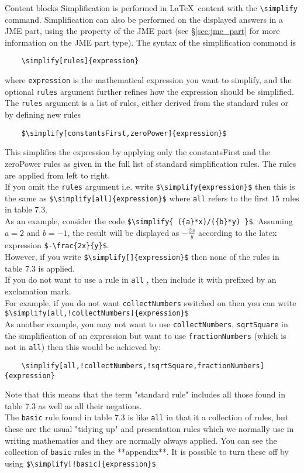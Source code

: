 \begin{chapter}{\label{cha:content_blocks}Content blocks}
  Simplification is performed in \LaTeX\ content with the \verb"\simplify"
  command.  Simplification can also be performed on the displayed answers in a
  JME part, using the  property of the JME part
  (see \S\ref{sec:jme_part} for more information on the JME part type).  The
  syntax of the simplification command is
  \begin{Verbatim}
    \simplify[rules]{expression}
  \end{Verbatim}
  where \verb"expression" is the mathematical expression you want to simplify,
  and the optional \verb"rules" argument further refines how the expression should be simplified.\\
  The \verb"rules" argument is a list of rules, either derived from the standard rules or by defining new rules\eg
  \begin{Verbatim}
    $\simplify[constantsFirst,zeroPower]{expression}$
  \end{Verbatim}
  This simplifies the expression by applying only the constantsFirst and the zeroPower rules as given in the full list of standard simplification rules. The rules are applied from left to right.\\
  If you omit the \verb"rules"  argument i.e. write \verb"$\simplify{expression}$" then this is the same as \verb"$\simplify[all]{expression}$" where \verb"all" refers to the first $15$ rules in table 7.3.\\
  As an example, consider the code \verb"$\simplify{ ({a}*x)/({b}*y) }$".
  Assuming $a=2$ and $b=-1$, the result will be displayed as $-\frac{2x}{y}$ according to the latex expression
  \verb"$-\frac{2x}{y}$".\\
  However, if you write \verb"$\simplify[]{expression}$" then none of the rules in table 7.3 is applied.\\
  If you do not want to use a rule in \verb"all" , then include it with prefixed by an exclamation mark. \\
  For example, if you do not want \verb"collectNumbers" switched on then you can write \verb"$\simplify[all,!collectNumbers]{expression}$"\\ 
  As another example, you may not want to use \verb"collectNumbers", \verb"sqrtSquare" in the simplification of an expression but want to use \verb"fractionNumbers" (which is not in \verb"all") then this would be achieved by:\\
  \begin{Verbatim}
    \simplify[all,!collectNumbers,!sqrtSquare,fractionNumbers]{expression}
  \end{Verbatim}
  Note that this means that the term "standard rule" includes all those found in table 7.3 as well as all their negations.\\
  The \verb"basic" rule found in table 7.3 is like \verb"all" in that it a collection of rules, but these are the usual "tidying up" and presentation rules which we normally use in writing mathematics and they are normally always applied.
  You can see the collection of \verb"basic" rules in the **appendix**. It is possible to turn these off by using \verb"$\simplify[!basic]{expression}$"
  	

\end{chapter}
